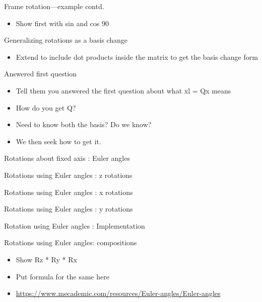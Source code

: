 \documentclass[presentation]{beamer}
\begin{document}
\begin{frame}[label={sec:orgdfd7591}]{Frame rotation---example contd.}
\begin{itemize}
\item Show first with sin and cos 90
\end{itemize}
\end{frame}
\begin{frame}[label={sec:orga3d00c5}]{Generalizing rotations as a basis change}
\begin{itemize}
\item Extend to include dot products inside the matrix to get the basis change form
\end{itemize}
\end{frame}
\begin{frame}[label={sec:org5c9749b}]{Answered first question}
\begin{itemize}
\item Tell them you answered the first question about what xl = Qx means
\item How do you get Q?
\item Need to know both the basis? Do we know?
\item We then seek how to get it.
\end{itemize}
\end{frame}
\begin{frame}[label={sec:orgc6f300c}]{Rotations about fixed axis : Euler angles}
\end{frame}
\begin{frame}[label={sec:orgc8d3f77}]{Rotations using Euler angles : z rotations}
\end{frame}
\begin{frame}[label={sec:orgb29688a}]{Rotations using Euler angles : x rotations}
\end{frame}
\begin{frame}[label={sec:org35bb055}]{Rotations using Euler angles : y rotations}
\end{frame}
\begin{frame}[label={sec:org4dfd48a}]{Rotation using Euler angles : Implementation}
\end{frame}
\begin{frame}[label={sec:org04a67e9}]{Rotations using Euler angles: compositions}
\begin{itemize}
\item Show Rz * Ry * Rx
\item Put formula for the same here
\item \url{https://www.mecademic.com/resources/Euler-angles/Euler-angles}
\end{itemize}
\end{frame}
\end{document}
